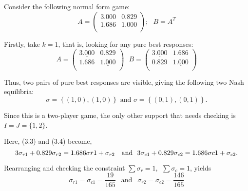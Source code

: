 Consider the following normal form game:
\begin{equation}
    A = \begin{pmatrix}
        3.000 & 0.829 \\
        1.686 & 1.000 \\
    \end{pmatrix}; ~~~
    B = A^{T}
\end{equation}\label{eqn:supp_en_ex}

Firstly, take \(k = 1\), that is, looking for any pure best responses:
\begin{displaymath}
    A = \begin{pmatrix}
        \underline{3.000} & 0.829 \\
        1.686 & \underline{1.000} \\
    \end{pmatrix} ~~~ B = \begin{pmatrix}
        \underline{3.000} & 1.686 \\
        0.829 & \underline{1.000} \\
    \end{pmatrix}
\end{displaymath}

Thus, two pairs of pure best responses are visible, giving the following two
Nash equilibria:
\begin{displaymath}
    \sigma = \left \{(1, 0), (1, 0)\right \} \text{   and   } \sigma = \left \{(0, 1), (0, 1)\right \}.
\end{displaymath}

Since this is a two-player game, the only other support that needs checking is
\(I = J = \{1, 2\} \). 

Here, (3.3) and (3.4) become,
\begin{displaymath}
    3\sigma_{r1} + 0.829\sigma_{r2} = 1.686\sigma{r1} + \sigma_{r2} ~~ \text{   and   } ~~ \\
    3\sigma_{c1} + 0.829\sigma_{c2} = 1.686\sigma{c1} + \sigma_{c2}.
\end{displaymath}

Rearranging and checking the constraint \(\sum{\sigma_{r} = 1}, ~~
\sum{\sigma_{c} = 1}\), yields 
\begin{displaymath}
    \sigma_{r1} = \sigma_{c1} = \frac{19}{165} ~~ \text{ and } ~~ \sigma_{r2} = \sigma_{c2} = \frac{146}{165}
\end{displaymath}

